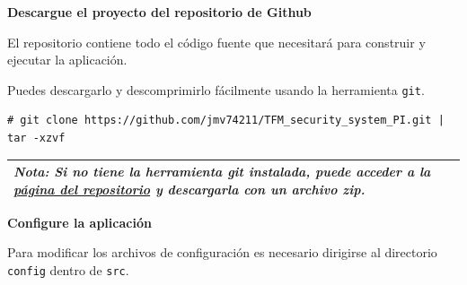 \newpage

\textbf{Descargue el proyecto del repositorio de Github}

El repositorio contiene todo el código fuente que necesitará para construir y ejecutar la aplicación.

Puedes descargarlo y descomprimirlo fácilmente usando la herramienta \texttt{git}.

\vspace{-0.8cm}

\begin{verbatim}
# git clone https://github.com/jmv74211/TFM_security_system_PI.git | tar -xzvf 
\end{verbatim}

\vspace{-0.5cm}

\begin{tabular}{|p{15.5cm}|}
	
	\hline
	
	\textit{\textbf{Nota}: Si no tiene la herramienta git instalada, puede acceder a la \href{https://github.com/jmv74211/TFM_security_system_PI}{página del repositorio} y descargarla con un archivo zip.}
	\\
	\hline
	
\end{tabular}

\textbf{Configure la aplicación}

Para modificar los archivos de configuración es necesario dirigirse al directorio \texttt{config} dentro de \texttt{src}.

